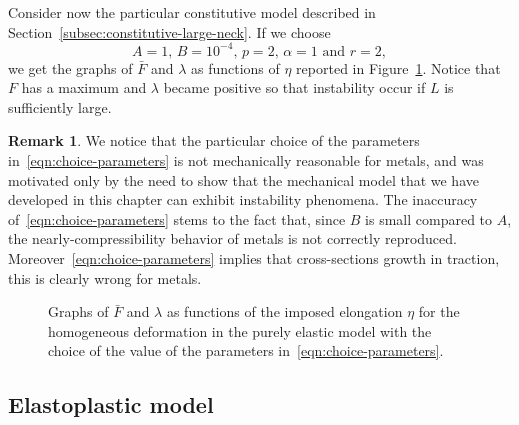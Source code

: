 \documentclass[a4paper,10pt,oneside]{amsbook}
\numberwithin{section}{chapter}
\numberwithin{equation}{chapter}
\theoremstyle{definition}
\newtheorem{rmk}[prop]{Remark}
\begin{document}
Consider now the particular constitutive model described in Section~\ref{subsec:constitutive-large-neck}. If we choose
\begin{equation}
\label{eqn:choice-parameters}
\text{$A=1$, $B=10^{-4}$, $p=2$, $\alpha=1$ and $r=2$},
\end{equation}
we get the graphs of $\bar F$ and $\lambda$ as functions of $\eta$ reported in Figure~\ref{fig:instability}. Notice that $F$ has a maximum and $\lambda$ became positive so that instability occur if $L$ is sufficiently large.
\begin{rmk}
We notice that the particular choice of the parameters in~\eqref{eqn:choice-parameters} is not mechanically reasonable for metals, and was motivated only by the need to show that the mechanical model that we have developed in this chapter can exhibit instability phenomena. The inaccuracy of~\eqref{eqn:choice-parameters} stems to the fact that, since $B$ is small compared to $A$, the nearly-compressibility behavior of metals is not correctly reproduced. Moreover~\eqref{eqn:choice-parameters} implies that cross-sections growth in traction, this is clearly wrong for metals.
\end{rmk}

\begin{figure}
\hfill
{}
\caption{Graphs of $\bar F$ and $\lambda$ as functions of the imposed elongation $\eta$ for the homogeneous deformation in the purely elastic model with the choice of the value of the parameters in~\ref{eqn:choice-parameters}.}
\label{fig:instability}
\end{figure}

\subsection{Elastoplastic model}
\label{subsec:plastic-model}
\end{document}
